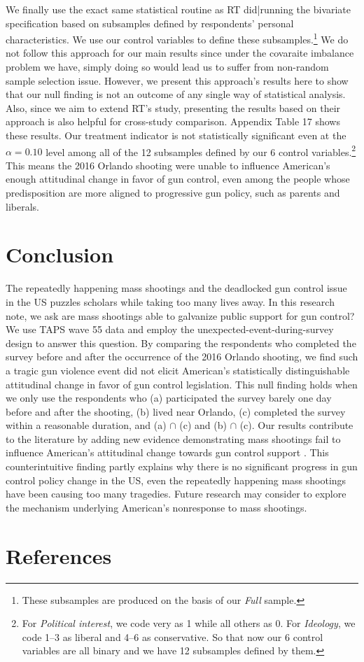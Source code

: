 \documentclass[11pt]{article}
\begin{document}
We finally use the exact same statistical routine as RT did|running the bivariate specification based on subsamples defined by respondents' personal characteristics. We use our control variables to define these subsamples.\footnote{These subsamples are produced on the basis of our \emph{Full} sample.} We do not follow this approach for our main results since under the covaraite imbalance problem we have, simply doing so would lead us to suffer from non-random sample selection issue. However, we present this approach's results here to show that our null finding is not an outcome of any single way of statistical analysis. Also, since we aim to extend RT's study, presenting the results based on their approach is also helpful for cross-study comparison. Appendix Table 17 shows these results. Our treatment indicator is not statistically significant even at the \(\alpha = 0.10\) level among all of the 12 subsamples defined by our 6 control variables.\footnote{For \emph{Political interest}, we code very as 1 while all others as 0. For \emph{Ideology}, we code 1--3 as liberal and 4--6 as conservative. So that now our 6 control variables are all binary and we have 12 subsamples defined by them.} This means the 2016 Orlando shooting were unable to influence American's enough attitudinal change in favor of gun control, even among the people whose predisposition are more aligned to progressive gun policy, such as parents and liberals. 

\section{Conclusion}
The repeatedly happening mass shootings and the deadlocked gun control issue in the US puzzles scholars while taking too many lives away. In this research note, we ask are mass shootings able to galvanize public support for gun control? We use TAPS wave 55 data and employ the unexpected-event-during-survey design to answer this question. By comparing the respondents who completed the survey before and after the occurrence of the 2016 Orlando shooting, we find such a tragic gun violence event did not elicit American's statistically distinguishable attitudinal change in favor of gun control legislation. This null finding holds when we only use the respondents who (a) participated the survey barely one day before and after the shooting, (b) lived near Orlando, (c) completed the survey within a reasonable duration, and (a) \(\cap\) (c) and (b) \(\cap\) (c). Our results contribute to the literature by adding new evidence demonstrating mass shootings fail to influence American's attitudinal change towards gun control support \autocites{rogowski2019critical-events}{barney2019reexamining-the}. This counterintuitive finding partly explains why there is no significant progress in gun control policy change in the US, even the repeatedly happening mass shootings have been causing too many tragedies. Future research may consider to explore the mechanism underlying American's nonresponse to mass shootings.

\section*{References}
{
\singlespacing
\printbibliography[heading = none]
}
\end{document}
